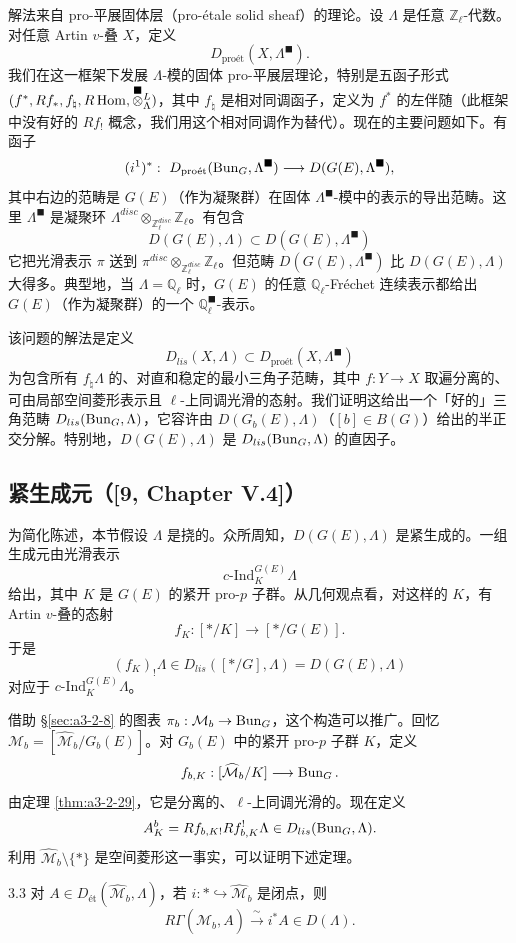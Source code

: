 解法来自 pro-平展固体层（pro-étale solid sheaf）的理论。设 $\Lambda$ 是任意 $\mathbb Z_\ell$-代数。对任意 Artin $v$-叠 $X$，定义
\[
D_{\text{proét}}(X,\Lambda^{\blacksquare}).
\]
我们在这一框架下发展 $\Lambda$-模的固体 pro-平展层理论，特别是五函子形式 $(f^*,Rf_*,f_\natural,R\operatorname{Hom},\overset{\blacksquare}{\otimes}{}^L_\Lambda)$，其中 $f_\natural$ 是相对同调函子，定义为 $f^*$ 的左伴随（此框架中没有好的 $Rf_!$ 概念，我们用这个相对同调作为替代）。现在的主要问题如下。有函子
\[
(i^1)^*:\ D_{\text{proét}}(\Bun_G,\Lambda^{\blacksquare})\longrightarrow D(G(E),\Lambda^{\blacksquare}),
\]
其中右边的范畴是 $G(E)$（作为凝聚群）在固体 $\Lambda^\blacksquare$-模中的表示的导出范畴。这里 $\Lambda^\blacksquare$ 是凝聚环 $\Lambda^{disc}\otimes_{\mathbb Z_\ell^{disc}}\mathbb Z_\ell$。有包含
\[
D(G(E),\Lambda)\subset D(G(E),\Lambda^{\blacksquare})
\]
它把光滑表示 $\pi$ 送到 $\pi^{disc}\otimes_{\mathbb Z_\ell^{disc}}\mathbb Z_\ell$。但范畴 $D(G(E),\Lambda^{\blacksquare})$ 比 $D(G(E),\Lambda)$ 大得多。典型地，当 $\Lambda=\mathbb Q_\ell$ 时，$G(E)$ 的任意 $\mathbb Q_\ell$-Fréchet 连续表示都给出 $G(E)$（作为凝聚群）的一个 $\mathbb Q_\ell^{\blacksquare}$-表示。

该问题的解法是定义
\[
D_{lis}(X,\Lambda)\subset D_{\text{proét}}(X,\Lambda^{\blacksquare})
\]
为包含所有 $f_\natural\Lambda$ 的、对直和稳定的最小三角子范畴，其中 $f:Y\to X$ 取遍分离的、可由局部空间菱形表示且 $\ell$-上同调光滑的态射。我们证明这给出一个「好的」三角范畴 $D_{lis}(\operatorname{Bun}_G,\Lambda)$，它容许由 $D(G_b(E),\Lambda)$（$[b]\in B(G)$）给出的半正交分解。特别地，$D(G(E),\Lambda)$ 是 $D_{lis}(\operatorname{Bun}_G,\Lambda)$ 的直因子。

\subsection{紧生成元（[9, Chapter V.4]）}

为简化陈述，本节假设 $\Lambda$ 是挠的。众所周知，$D(G(E),\Lambda)$ 是紧生成的。一组生成元由光滑表示
\[
c\text{-Ind}_K^{G(E)}\Lambda
\]
给出，其中 $K$ 是 $G(E)$ 的紧开 pro-$p$ 子群。从几何观点看，对这样的 $K$，有 Artin $v$-叠的态射
\[
f_K:[*/K]\longrightarrow[*/G(E)].
\]
于是
\[
(f_K)_!\Lambda\in D_{lis}([*/G],\Lambda)=D(G(E),\Lambda)
\]
对应于 $c\text{-Ind}_K^{G(E)}\Lambda$。

借助 §\ref{sec:a3-2-8} 的图表 $\pi_b:\mathcal M_b\to\operatorname{Bun}_G$，这个构造可以推广。回忆 $\mathcal M_b=[\widehat{\mathcal M}_b/G_b(E)]$。对 $G_b(E)$ 中的紧开 pro-$p$ 子群 $K$，定义
\[
f_{b,K}:[\widehat{\mathcal M}_b/K]\longrightarrow\operatorname{Bun}_G.
\]
由定理 \ref{thm:a3-2-29}，它是分离的、$\ell$-上同调光滑的。现在定义
\[
A^b_K=Rf_{b,K!}Rf^!_{b,K}\Lambda\in D_{lis}(\operatorname{Bun}_G,\Lambda).
\]
利用 $\widehat{\mathcal M}_b\setminus\{*\}$ 是空间菱形这一事实，可以证明下述定理。
\begin{thm}{3.3}
对 $A\in D_{\text{ét}}(\widehat{\mathcal M}_b,\Lambda)$，若 $i:*\hookrightarrow\widehat{\mathcal M}_b$ 是闭点，则
\[
R\Gamma(\widehat{\mathcal M}_b,A)\xrightarrow{\ \sim\ }i^*A\in D(\Lambda).
\]
\label{thm:a3-3-3}
\end{thm}

